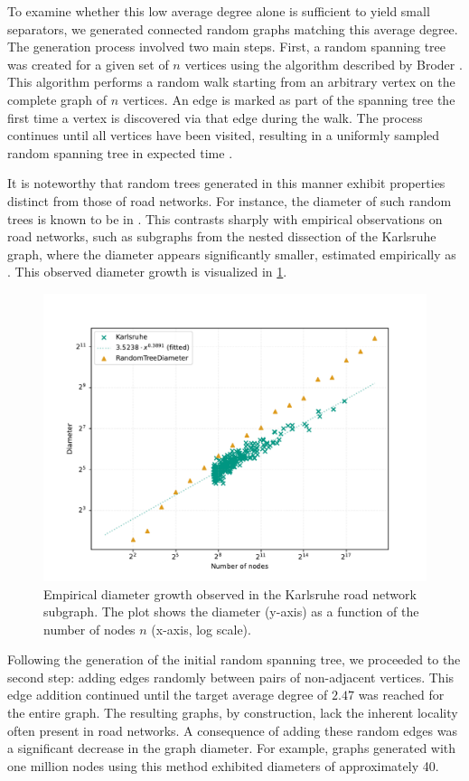 To examine whether this low average degree alone is sufficient to yield small separators, we generated connected random graphs matching this average degree.
The generation process involved two main steps.
First, a random spanning tree was created for a given set of \(n\) vertices using the algorithm described by Broder \cite{broder_generating_1989}.
This algorithm performs a random walk starting from an arbitrary vertex on the complete graph of \(n\) vertices.
An edge is marked as part of the spanning tree the first time a vertex is discovered via that edge during the walk.
The process continues until all vertices have been visited, resulting in a uniformly sampled random spanning tree in expected time .

It is noteworthy that random trees generated in this manner exhibit properties distinct from those of road networks.
For instance, the diameter of such random trees is known to be in  \cite{chlamtac_tree-based_1987}.
This contrasts sharply with empirical observations on road networks, such as subgraphs from the nested dissection of the Karlsruhe graph, where the diameter appears significantly smaller, estimated empirically as .
This observed diameter growth is visualized in \cref{fig:diameter_karlsruhe}.

\begin{figure}
	\centering
	\includegraphics[width=0.6\linewidth]{graphics/diameters.pdf}
	\caption{Empirical diameter growth observed in the Karlsruhe road network subgraph. The plot shows the diameter (y-axis) as a function of the number of nodes \(n\) (x-axis, log scale).}
	\label{fig:diameter_karlsruhe}
\end{figure}

Following the generation of the initial random spanning tree, we proceeded to the second step: adding edges randomly between pairs of non-adjacent vertices.
This edge addition continued until the target average degree of \(2.47\) was reached for the entire graph.
The resulting graphs, by construction, lack the inherent locality often present in road networks.
A consequence of adding these random edges was a significant decrease in the graph diameter.
For example, graphs generated with one million nodes using this method exhibited diameters of approximately 40.

